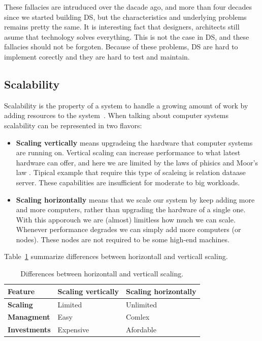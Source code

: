 These fallacies are intruduced over the dacade ago, and more than four decades since we started building DS, but the characteristics and underlying problems remains pretty the same. It is interesting fact that designers, architects still asume that technology solves everything. This is not the case in DS, and these fallacies should not be forgoten. Because of these problems, DS are hard to implement corectly and they are hard to test and maintain.
%
%
\subsection{Scalability}\label{sec:scalability}
%
Scalability is the property of a system to handle a growing amount of work by adding resources to the system~\cite{Bondi00}. When talking about computer systems scalability can be represented in two flavors:

\begin{itemize}
	\item \textbf{Scaling vertically} means upgradeing the hardware that computer systems are running on. Vertical scaling can increase performance to what latest hardware can offer, and here we are limited by the laws of phisics and Moor's law \cite{Gustafson2011}. Tipical example that require this type of scaleing is relation dataase server. These capabilities are insufficient for moderate to big workloads.
	\item \textbf{Scaling horizontally} means that we scale our system by keep adding more and more computers, rather than upgrading the hardware of a single one. With this apporouch we are (almost) limitless how much we can scale. Whenever performance degrades we can simply add more computers (or nodes). These nodes are not required to be some high-end machines.
\end{itemize}

Table~\ref{tab:table1} summarize differences between horizontall and verticall scaling.

\begin{table}[h!]
	\begin{center}
		\begin{tabular}{l|l|l}
			\textbf{Feature} & \textbf{Scaling vertically} & \textbf{Scaling horizontally}\\
			\hline
			\textbf{Scaling} & Limited & Unlimited \\
			\textbf{Managment} & Easy & Comlex\\
			\textbf{Investments} & Expensive & Afordable \\
		\end{tabular}
	\end{center}
	\vspace{-0.5cm}
	\caption{Differences between horizontall and verticall scaling.}
	\label{tab:table1}
\end{table}

